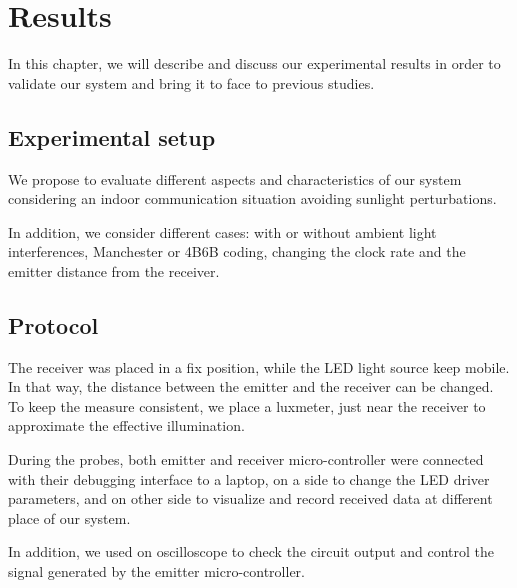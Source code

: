 
\chapter{Results} %

\label{Results} %


In this chapter, we will describe and discuss our experimental results in order to validate our system and bring it to face to previous studies.
 

\section{Experimental setup}

We propose to evaluate different aspects and characteristics of our system considering an indoor communication situation avoiding sunlight perturbations.

In addition, we consider different cases: with or without ambient light interferences, Manchester or 4B6B coding, changing the clock rate and the emitter distance from the receiver. 

\section{Protocol}

The receiver was placed in a fix position, while the LED light source keep mobile. In that way, the distance between the emitter and the receiver can  be changed. To keep the measure consistent, we place a luxmeter, just near the receiver to approximate the effective illumination.

During the probes, both emitter and receiver micro-controller were connected with their debugging interface to a laptop, on a side to change the LED driver parameters, and on other side to visualize and record received data at different place of our system. 

In addition, we used on oscilloscope to check the circuit output and control the signal generated by the emitter micro-controller.

